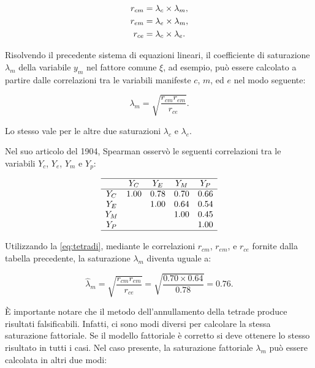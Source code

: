 \documentclass[
  11pt,
]{krantz}
\theoremstyle{definition}
\theoremstyle{definition}
\theoremstyle{definition}
\theoremstyle{definition}
\theoremstyle{remark}
\begin{document}
\begin{equation}
\begin{aligned}
  r_{cm} &= \lambda_c \times \lambda_m, \notag \\
  r_{em} &= \lambda_e \times \lambda_m,  \\
  r_{ce} &= \lambda_c \times \lambda_e. \notag
\end{aligned}
\end{equation}

Risolvendo il precedente sistema di equazioni lineari, il coefficiente di saturazione \(\lambda_m\) della variabile \(y_m\) nel fattore comune \(\xi\), ad esempio, può essere calcolato a partire dalle correlazioni tra le variabili manifeste \(c\), \(m\), ed \(e\) nel modo seguente:

\begin{equation}
\lambda_m = \sqrt{ \frac{r_{cm} r_{em}}{r_{ce}}}.
\label{eq:tetradi}
\end{equation}

Lo stesso vale per le altre due saturazioni \(\lambda_c\) e \(\lambda_e\).

Nel suo articolo del 1904, Spearman osservò le seguenti correlazioni tra le variabili \(Y_c\), \(Y_e\), \(Y_m\) e \(Y_p\):

\[
\begin{array}{ccccc}
  \hline
    & Y_C & Y_E & Y_M & Y_P \\
  \hline
  Y_C & 1.00 & 0.78 & 0.70 & 0.66 \\
  Y_E &   & 1.00 & 0.64 & 0.54 \\
  Y_M &   &   & 1.00 & 0.45 \\
  Y_P &   &   &   & 1.00 \\
  \hline
\end{array}
\]

Utilizzando la \eqref{eq:tetradi}, mediante le correlazioni \(r_{cm}\), \(r_{em}\), e \(r_{ce}\) fornite dalla tabella precedente, la saturazione \(\lambda_m\) diventa uguale a:

\[
  \hat{\lambda}_m = \sqrt{ \frac{r_{cm} r_{em}}{r_{ce}} } = \sqrt{
    \frac{0.70 \times 0.64}{0.78} } = 0.76.
\]

È importante notare che il metodo dell'annullamento della tetrade produce risultati falsificabili. Infatti, ci sono modi diversi per calcolare la stessa saturazione fattoriale. Se il modello fattoriale è corretto si deve ottenere lo stesso risultato in tutti i casi. Nel caso presente, la saturazione fattoriale \(\lambda_m\) può essere calcolata in altri due modi:
\end{document}
